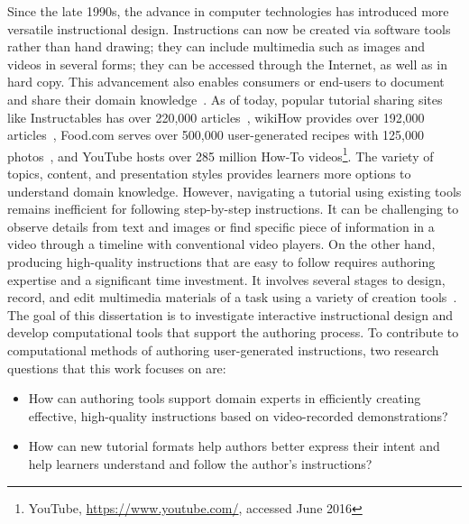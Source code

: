 Since the late 1990s, the advance in computer technologies has introduced more versatile instructional design. Instructions can now be created via software tools rather than hand drawing; they can include multimedia such as images and videos in several forms; they can be accessed through the Internet, as well as in hard copy.
%
This advancement also enables consumers or end-users to document and share their domain knowledge~\cite{Lafreniere:2012tl}. As of today, popular tutorial sharing sites like Instructables has over 220,000 articles~\cite{InstructablesProjects}, wikiHow provides over 192,000 articles~\cite{wikiHowStatistics}, Food.com serves over 500,000 user-generated recipes with 125,000 photos~\cite{FoodComAbout}, and YouTube hosts over 285 million How-To videos\footnote{YouTube, \url{https://www.youtube.com/}, accessed June 2016}.
%
The variety of topics, content, and presentation styles provides learners more options to understand domain knowledge.
%
However, navigating a tutorial using existing tools remains inefficient for following step-by-step instructions. It can be challenging to observe details from text and images or find specific piece of information in a video through a timeline with conventional video players.
%
On the other hand, producing high-quality instructions that are easy to follow requires authoring expertise and a significant time investment. It involves several stages to design, record, and edit multimedia materials of a task using a variety of creation tools~\cite{Torrey:2007he,Tseng:2014:PVP:2598510.2598540,Muller:2009tw}.\\

The goal of this dissertation is to investigate interactive instructional design and develop computational tools that support the authoring process.
%
To contribute to computational methods of authoring user-generated instructions, two research questions that this work focuses on are:

\begin{itemize}
  \item How can authoring tools support domain experts in efficiently creating effective, high-quality instructions based on video-recorded demonstrations?
  \item How can new tutorial formats help authors better express their intent and help learners understand and follow the author's instructions?
\end{itemize}

